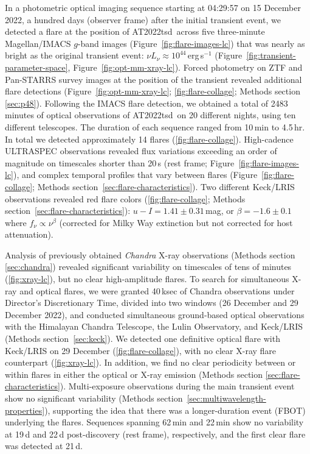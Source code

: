\documentclass{nature_plusfigure}
\newcommand{\at}{AT2022tsd}
\begin{document}
In a photometric optical imaging sequence starting at 04:29:57 on 15 December 2022, a hundred days (observer frame) after the initial transient event, we detected\cite{Ho2022_Astronote_Flares} a flare at the position of \at\ across five three-minute Magellan/IMACS $g$-band images (Figure~\ref{fig:flare-images-lc}) that was nearly as bright as the original transient event: $\nu L_\nu \approx 10^{44}\,$erg\,s$^{-1}$ (Figure~\ref{fig:transient-parameter-space}, Figure~\ref{fig:opt-mm-xray-lc}).
Forced photometry on ZTF and Pan-STARRS survey\cite{Tonry2012,Chambers2016} images at the position of the transient revealed additional flare detections (Figure~\ref{fig:opt-mm-xray-lc}; \ref{fig:flare-collage}; Methods section \ref{sec:p48}).
Following the IMACS flare detection, we obtained a total of 2483 minutes of optical observations of \at\ on 20 different nights, using ten different telescopes. The duration of each sequence ranged from 10\,min to 4.5\,hr. In total we detected approximately 14 flares (\ref{fig:flare-collage}). High-cadence ULTRASPEC\cite{Dhillon2014} observations revealed flux variations exceeding an order of magnitude on timescales shorter than 20\,s (rest frame; Figure~\ref{fig:flare-images-lc}), and complex temporal profiles that vary between flares (Figure~\ref{fig:flare-collage}; Methods section~\ref{sec:flare-characteristics}).
Two different Keck/LRIS observations revealed red flare colors (\ref{fig:flare-collage}; Methods section~\ref{sec:flare-characteristics}):
$u-I=1.41\pm0.31\,$mag, or $\beta=-1.6\pm0.1$ where
$f_\nu \propto \nu^{\beta}$ (corrected for Milky Way extinction but not corrected for host attenuation).

Analysis of previously obtained \emph{Chandra} X-ray observations\cite{Matthews2022} (Methods section \ref{sec:chandra}) revealed significant variability on timescales of tens of minutes (\ref{fig:xray-lc}), but no clear high-amplitude flares. To search for simultaneous X-ray and optical flares,
we were granted 40\,ksec of Chandra observations under Director's Discretionary Time, divided into two windows (26 December and 29 December 2022),
and conducted simultaneous ground-based optical observations with the Himalayan Chandra Telescope, the Lulin Observatory, and Keck/LRIS (Methods section~\ref{sec:keck}). We detected one definitive optical flare with Keck/LRIS on 29 December (\ref{fig:flare-collage}), with no clear X-ray flare counterpart (\ref{fig:xray-lc}).
In addition, we find no clear periodicity between or within flares in either the optical or X-ray emission (Methods section \ref{sec:flare-characteristics}).
Multi-exposure observations during the main transient event show no significant variability (Methods section~\ref{sec:multiwavelength-properties}), supporting the idea that there was a longer-duration event (FBOT) underlying the flares.
Sequences spanning 62\,min and 22\,min show no variability at 19\,d and 22\,d post-discovery (rest frame), respectively, and the first clear flare was detected at 21\,d.
\end{document}
